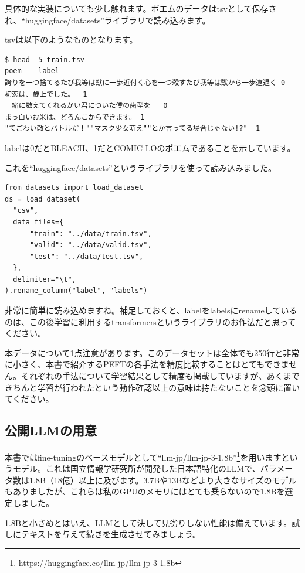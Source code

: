 \documentclass[a5paper,twoside,dvipdfmx]{jsarticle}
\begin{document}
具体的な実装についても少し触れます。ポエムのデータはtsvとして保存され、``huggingface/datasets''ライブラリで読み込みます。

tsvは以下のようなものとなります。

\begin{lstlisting}
$ head -5 train.tsv
poem	label
誇りを一つ捨てるたび我等は獣に一歩近付く心を一つ殺すたび我等は獣から一歩遠退く	0
初恋は、歳上でした。	1
一緒に数えてくれるかい君についた僕の歯型を	0
まっ白いお米は、どろんこからできます。	1
"てごわい敵とバトルだ！""マスク少女萌え""とか言ってる場合じゃない!?"	1
\end{lstlisting}

labelは0だとBLEACH、1だとCOMIC LOのポエムであることを示しています。

これを``huggingface/datasets''というライブラリを使って読み込みました。

\begin{lstlisting}
from datasets import load_dataset
ds = load_dataset(
  "csv",
  data_files={
      "train": "../data/train.tsv",
      "valid": "../data/valid.tsv",
      "test": "../data/test.tsv",
  },
  delimiter="\t",
).rename_column("label", "labels")
\end{lstlisting}

非常に簡単に読み込めますね。補足しておくと、labelをlabelsにrenameしているのは、この後学習に利用するtransformersというライブラリのお作法だと思ってください。

本データについて1点注意があります。このデータセットは全体でも250行と非常に小さく、本書で紹介するPEFTの各手法を精度比較することはとてもできません。それぞれの手法について学習結果として精度も掲載していますが、あくまできちんと学習が行われたという動作確認以上の意味は持たないことを念頭に置いてください。


\subsection{公開LLMの用意}

本書ではfine-tuningのベースモデルとして``llm-jp/llm-jp-3-1.8b''\footnote{\url{https://huggingface.co/llm-jp/llm-jp-3-1.8b}}を用いますというモデル。これは国立情報学研究所が開発した日本語特化のLLMで、パラメータ数は1.8B（18億）以上に及びます。3.7Bや13Bなどより大きなサイズのモデルもありましたが、これらは私のGPUのメモリにはとても乗らないので1.8Bを選定しました。

1.8Bと小さめとはいえ、LLMとして決して見劣りしない性能は備えています。試しにテキストを与えて続きを生成させてみましょう。
\end{document}
